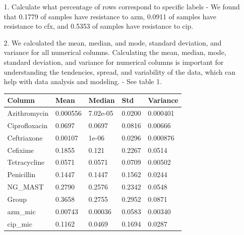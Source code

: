 \documentclass[manuscript,screen,review, nonacm]{acmart}
\begin{document}
\begin{itemize}
    \item[1.] Calculate what percentage of rows correspond to specific labels - We found that 0.1779 of samples have resistance to azm, 
    0.0911 of samples have resistance to cfx, and 0.5353 of samples have resistance to cip.
    \item[2.] We calculated the mean, median, and mode, standard deviation, and variance for all numerical columns. 
    Calculating the mean, median, mode, standard deviation, and variance for numerical columns is important for understanding the tendencies, spread, and variability of the data,
    which can help with data analysis and modeling. - See table 1.
    \begin{table}[H]
        \centering
        \begin{tabular}{|l|l|l|l|l|}
        \hline
        \textbf{Column}       & \textbf{Mean}    & \textbf{Median}  & \textbf{Std}     & \textbf{Variance} \\ \hline
        Azithromycin          & 0.000556         & 7.02e-05         & 0.0200           & 0.000401          \\ \hline
        Ciprofloxacin         & 0.0697           & 0.0697           & 0.0816           & 0.00666           \\ \hline
        Ceftriaxone           & 0.00107          & 1e-06            & 0.0296           & 0.000876          \\ \hline
        Cefixime              & 0.1855           & 0.121            & 0.2267           & 0.0514            \\ \hline
        Tetracycline          & 0.0571           & 0.0571           & 0.0709           & 0.00502           \\ \hline
        Penicillin            & 0.1447           & 0.1447           & 0.1562           & 0.0244            \\ \hline
        NG\_MAST              & 0.2790           & 0.2576           & 0.2342           & 0.0548            \\ \hline
        Group                 & 0.3658           & 0.2755           & 0.2952           & 0.0871            \\ \hline
        azm\_mic              & 0.00743          & 0.00036          & 0.0583           & 0.00340           \\ \hline
        cip\_mic              & 0.1162           & 0.0469           & 0.1694           & 0.0287            \\ \hline

\end{tabular}
\end{table}
\end{itemize}
\end{document}
